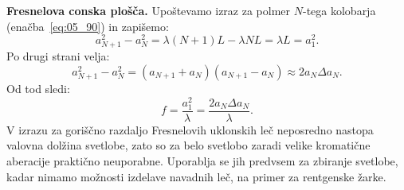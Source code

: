 \begin{example}{\bf Fresnelova conska plošča.}
Upoštevamo izraz za polmer $N$-tega kolobarja (enačba~\ref{eq:05_90}) in zapišemo:  
\begin{equation}
a_{N+1}^2 - a_N^2 = \lambda (N+1)L - \lambda NL = \lambda L = a_1^2. 
\label{eq:05_93}
\end{equation}
Po drugi strani velja:
\begin{equation}
a_{N+1}^2 - a_N^2 = \left(a_{N+1}+a_N\right)\left(a_{N+1}- a_N\right) \approx 2a_N\Delta a_N.
\label{eq:05_94}
\end{equation}
Od tod sledi:
\begin{equation}
f = \frac{a_1^2}{\lambda} = \frac{2 a_N\Delta a_N}{\lambda}.
\label{eq:05_95}
\end{equation}
V izrazu za goriščno razdaljo Fresnelovih uklonskih leč neposredno nastopa valovna dolžina svetlobe, 
zato so za belo svetlobo zaradi velike kromatične aberacije praktično neuporabne. Uporablja se jih
predvsem za zbiranje svetlobe, kadar nimamo možnosti izdelave navadnih leč, na primer za rentgenske
žarke.
\end{example}

